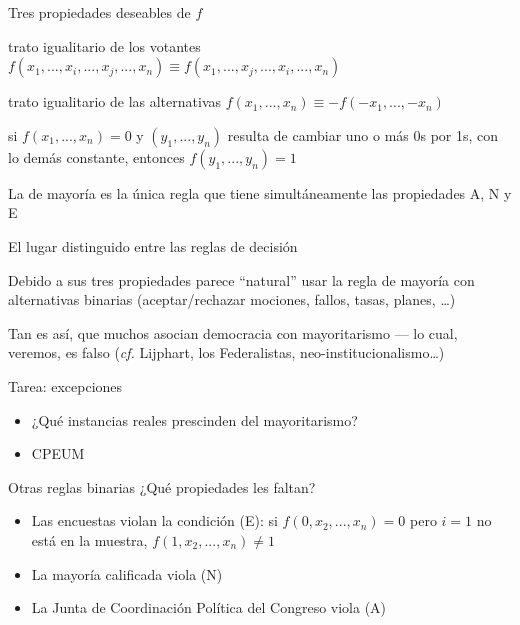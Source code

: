 \documentclass[bigger]{beamer}
\begin{document}
\begin{frame}[label={sec:org6079a5b}]{Tres propiedades deseables de \(f\)}
\begin{description}[<+->]
\item[{(A) Anonimidad}] trato igualitario de los votantes \(f(x_1,...,x_i,...,x_j,...,x_n) \equiv f(x_1,...,x_j,...,x_i,...,x_n)\)
\item[{(N) Neutralidad}] trato igualitario de las alternativas \(f(x_1,...,x_n) \equiv -f(-x_1,...,-x_n)\)
\item[{(E) Fragilidad de empates}] si \(f(x_1,...,x_n) = 0\) y \((y_1,...,y_n)\) resulta de cambiar uno o más 0s por 1s, con lo demás constante, entonces \(f(y_1,...,y_n) = 1\)
\end{description}
\bigskip \pause
\begin{theorem}[de May]
La de mayoría es la única regla que tiene simultáneamente las propiedades A, N y E 
\end{theorem}
\end{frame}

\begin{frame}[label={sec:org3f3ec57}]{El lugar distinguido entre las reglas de decisión}
\begin{block}{Debido a sus tres propiedades}
parece ``natural'' usar la regla de mayoría con alternativas binarias (aceptar/rechazar mociones, fallos, tasas, planes, \ldots{})
\end{block}

\bigskip \pause
Tan es así, que muchos asocian \alert{democracia} con \alert{mayoritarismo} --- lo cual, veremos, es falso (\emph{cf.} Lijphart, los Federalistas, neo-institucionalismo\ldots{})

\bigskip \pause
\begin{exampleblock}{Tarea: excepciones}
\begin{itemize}
\item ¿Qué instancias reales prescinden del mayoritarismo?
\item CPEUM
\end{itemize}
\end{exampleblock}
\end{frame}

\begin{frame}[label={sec:orgb1068a9}]{Otras reglas binarias}
¿Qué propiedades les faltan?
\begin{itemize}
\item Las encuestas violan la condición (E): si \(f(0,x_2,...,x_n)=0\) pero \(i=1\) no está en la muestra, \(f(1,x_2,...,x_n)\neq1\)
\item La mayoría calificada viola (N)
\item La Junta de Coordinación Política del Congreso viola (A)
\end{itemize}
\end{frame}
\end{document}
